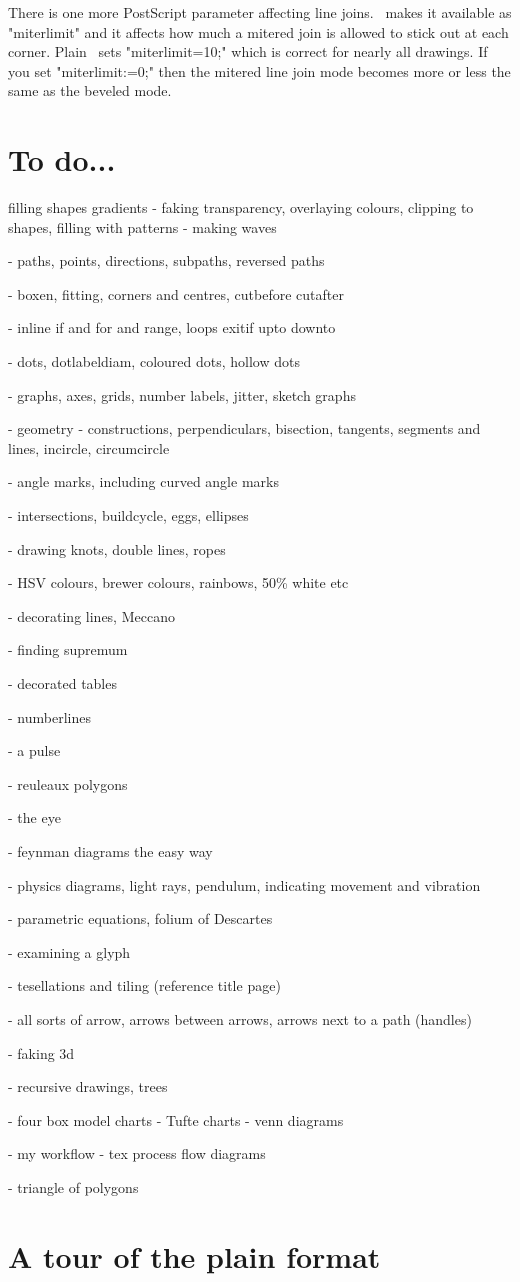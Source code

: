 \documentclass[a4paper,landscape]{article}
\begin{document}
There is one more PostScript parameter affecting line joins. \MP\ makes it available as "miterlimit" 
and it affects how much a mitered join is allowed to stick out at each corner.  Plain \MP\ sets
"miterlimit=10;" which is correct for nearly all drawings.  If you set
"miterlimit:=0;" then the mitered line join mode becomes more or less the same as the
beveled mode.

\newpage
\section{To do...}


filling shapes
gradients
- faking transparency, overlaying colours, clipping to shapes, filling with patterns
- making waves

- paths, points, directions, subpaths, reversed paths

- boxen, fitting, corners and centres, cutbefore cutafter

- inline if and for and range, loops exitif upto downto

- dots, dotlabeldiam, coloured dots, hollow dots


- graphs, axes, grids, number labels, jitter, sketch graphs


- geometry - constructions, perpendiculars, bisection, tangents, segments and lines,
  incircle, circumcircle

- angle marks, including curved angle marks

- intersections, buildcycle, eggs, ellipses


- drawing knots, double lines, ropes


- HSV colours, brewer colours, rainbows, 50\% white etc

- decorating lines, Meccano


- finding supremum

- decorated tables

- numberlines


- a pulse

- reuleaux polygons

- the eye

- feynman diagrams the easy way

- physics diagrams, light rays, pendulum, indicating movement and vibration

- parametric equations, folium of Descartes

- examining a glyph

- tesellations and tiling (reference title page)

- all sorts of arrow, arrows between arrows, arrows next to a path (handles)

- faking 3d


- recursive drawings, trees

- four box model charts - Tufte charts - venn diagrams

- my workflow 
- tex process flow diagrams

- triangle of polygons

\newpage
\section{A tour of the plain format}
\newpage
\tableofcontents
\end{document}
